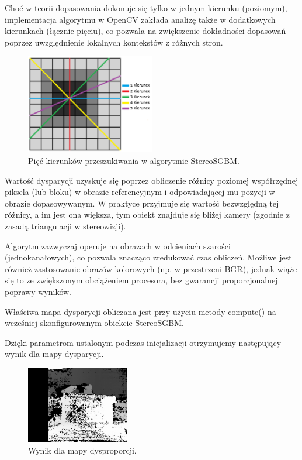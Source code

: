 \documentclass[magisterska]{pracadypl}
\begin{document}
Choć w teorii dopasowania dokonuje się tylko w jednym kierunku (poziomym), implementacja algorytmu w OpenCV zakłada analizę także w dodatkowych kierunkach (łącznie pięciu), co pozwala na zwiększenie dokładności dopasowań poprzez uwzględnienie lokalnych kontekstów z różnych stron.

\begin{figure}[H]
\centering
\includegraphics[width=0.5\textwidth]{images/dopracy2.png}
\captionsetup{font=footnotesize}
\caption[Pięć kierunków przeszukiwania w algorytmie StereoSGBM. Opracowanie własne.]{Pięć kierunków przeszukiwania w algorytmie StereoSGBM.}
\end{figure}

Wartość dysparycji uzyskuje się poprzez obliczenie różnicy poziomej współrzędnej piksela (lub bloku) w obrazie referencyjnym i odpowiadającej mu pozycji w obrazie dopasowywanym. W praktyce przyjmuje się wartość bezwzględną tej różnicy, a im jest ona większa, tym obiekt znajduje się bliżej kamery (zgodnie z zasadą triangulacji w stereowizji).

Algorytm zazwyczaj operuje na obrazach w odcieniach szarości (jednokanałowych), co pozwala znacząco zredukować czas obliczeń. Możliwe jest również zastosowanie obrazów kolorowych (np. w przestrzeni BGR), jednak wiąże się to ze zwiększonym obciążeniem procesora, bez gwarancji proporcjonalnej poprawy wyników.

Właściwa mapa dysparycji obliczana jest przy użyciu metody compute() na wcześniej skonfigurowanym obiekcie StereoSGBM.

Dzięki parametrom ustalonym podczas inicjalizacji otrzymujemy następujący wynik dla mapy dysparycji.

\begin{figure}[H]  %
    \centering  %
    \includegraphics[width=0.4\textwidth]{images/dopracy3.png}  %
    \captionsetup{font=footnotesize}
    \caption[Wynik dla mapy dysproporcji. Opracowanie własne.]{Wynik dla mapy dysproporcji.}
\end{figure}
\end{document}
